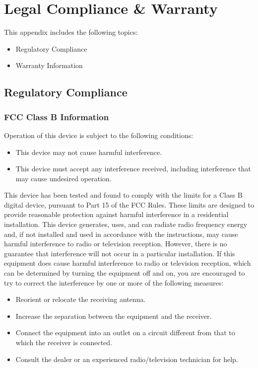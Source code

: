 \documentclass[letterpaper,10pt,openany,oneside,english]{sphinxmanual}
\begin{document}
\chapter{Legal Compliance \& Warranty}
\label{\detokenize{warranty:legal-compliance-warranty}}\label{\detokenize{warranty::doc}}
This appendix includes the following topics:
\begin{itemize}
\item {} 
Regulatory Compliance

\item {} 
Warranty Information

\end{itemize}


\section{Regulatory Compliance}
\label{\detokenize{warranty:regulatory-compliance}}

\subsection{FCC Class B Information}
\label{\detokenize{warranty:fcc-class-b-information}}
Operation of this device is subject to the following conditions:
\begin{itemize}
\item {} 
This device may not cause harmful interference.

\item {} 
This device must accept any interference received, including interference that may cause undesired operation.

\end{itemize}

This device has been tested and found to comply with the limits for a Class B digital device, pursuant to Part 15 of the FCC Rules. These limits are designed to provide reasonable protection against harmful interference in a residential installation. This device generates, uses, and can radiate radio frequency energy and, if not installed and used in accordance with the instructions, may cause harmful interference to radio or television reception. However, there is no guarantee that interference will not occur in a particular installation. If this equipment does cause harmful interference to radio or television reception, which can be determined by turning the equipment off and on, you are encouraged to try to correct the interference by one or more of the following measures:
\begin{itemize}
\item {} 
Reorient or relocate the receiving antenna.

\item {} 
Increase the separation between the equipment and the receiver.

\item {} 
Connect the equipment into an outlet on a circuit different from that to which the receiver is connected.

\item {} 
Consult the dealer or an experienced radio/television technician for help.

\end{itemize}
\end{document}

